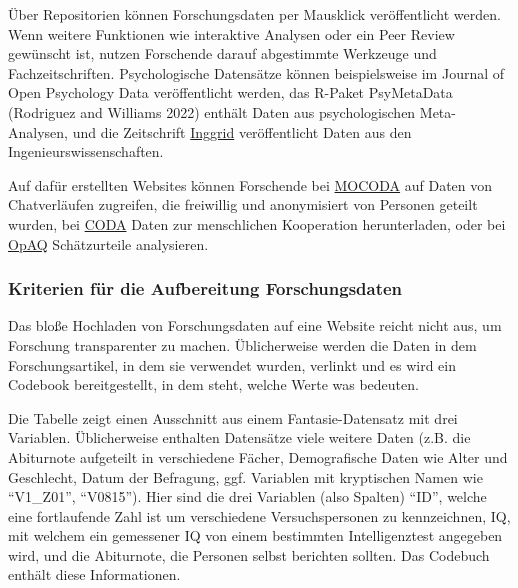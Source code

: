 \documentclass[
  letterpaper,
  DIV=11,
  numbers=noendperiod]{scrreprt}
\begin{document}
\begin{tcolorbox}[enhanced jigsaw, left=2mm, colback=white, colframe=quarto-callout-warning-color-frame, opacitybacktitle=0.6, opacityback=0, title=\textcolor{quarto-callout-warning-color}{\faExclamationTriangle}\hspace{0.5em}{Wo werden Forschungsdaten veröffentlicht?}, toptitle=1mm, coltitle=black, colbacktitle=quarto-callout-warning-color!10!white, titlerule=0mm, bottomtitle=1mm, leftrule=.75mm, breakable, rightrule=.15mm, bottomrule=.15mm, toprule=.15mm, arc=.35mm]

Über Repositorien können Forschungsdaten per Mausklick veröffentlicht
werden. Wenn weitere Funktionen wie interaktive Analysen oder ein Peer
Review gewünscht ist, nutzen Forschende darauf abgestimmte Werkzeuge und
Fachzeitschriften. Psychologische Datensätze können beispielsweise im
Journal of Open Psychology Data veröffentlicht werden, das R-Paket
PsyMetaData (Rodriguez and Williams 2022) enthält Daten aus
psychologischen Meta-Analysen, und die Zeitschrift
\href{https://www.inggrid.org}{Inggrid} veröffentlicht Daten aus den
Ingenieurswissenschaften.

Auf dafür erstellten Websites können Forschende bei
\href{https://db.mocoda2.de}{MOCODA} auf Daten von Chatverläufen
zugreifen, die freiwillig und anonymisiert von Personen geteilt wurden,
bei \href{https://cooperationdatabank.org}{CODA} Daten zur menschlichen
Kooperation herunterladen, oder bei
\href{https://metaanalyses.shinyapps.io/OpAQ/}{OpAQ} Schätzurteile
analysieren.

\end{tcolorbox}

\subsubsection{Kriterien für die Aufbereitung
Forschungsdaten}\label{kriterien-fuxfcr-die-aufbereitung-forschungsdaten}

Das bloße Hochladen von Forschungsdaten auf eine Website reicht nicht
aus, um Forschung transparenter zu machen. Üblicherweise werden die
Daten in dem Forschungsartikel, in dem sie verwendet wurden, verlinkt
und es wird ein Codebook bereitgestellt, in dem steht, welche Werte was
bedeuten.

Die Tabelle zeigt einen Ausschnitt aus einem Fantasie-Datensatz mit drei
Variablen. Üblicherweise enthalten Datensätze viele weitere Daten (z.B.
die Abiturnote aufgeteilt in verschiedene Fächer, Demografische Daten
wie Alter und Geschlecht, Datum der Befragung, ggf. Variablen mit
kryptischen Namen wie ``V1\_Z01'', ``V0815''). Hier sind die drei
Variablen (also Spalten) ``ID'', welche eine fortlaufende Zahl ist um
verschiedene Versuchspersonen zu kennzeichnen, IQ, mit welchem ein
gemessener IQ von einem bestimmten Intelligenztest angegeben wird, und
die Abiturnote, die Personen selbst berichten sollten. Das Codebuch
enthält diese Informationen.
\end{document}
